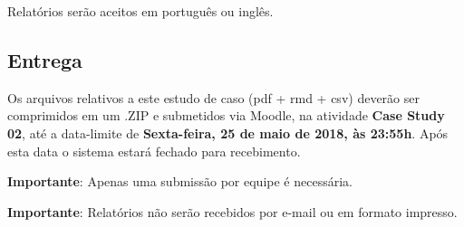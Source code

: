 \documentclass[11pt,twoside,printwatermark=false]{pinp}
\begin{document}
Relatórios serão aceitos em português ou inglês.

\subsection{Entrega}\label{entrega}

Os arquivos relativos a este estudo de caso (pdf + rmd + csv) deverão
ser comprimidos em um .ZIP e submetidos via Moodle, na atividade
\textbf{Case Study 02}, até a data-limite de \textbf{Sexta-feira, 25 de
maio de 2018, às 23:55h}. Após esta data o sistema estará fechado para
recebimento.

\textbf{Importante}: Apenas uma submissão por equipe é necessária.

\textbf{Importante}: Relatórios não serão recebidos por e-mail ou em
formato impresso.





\end{document}
